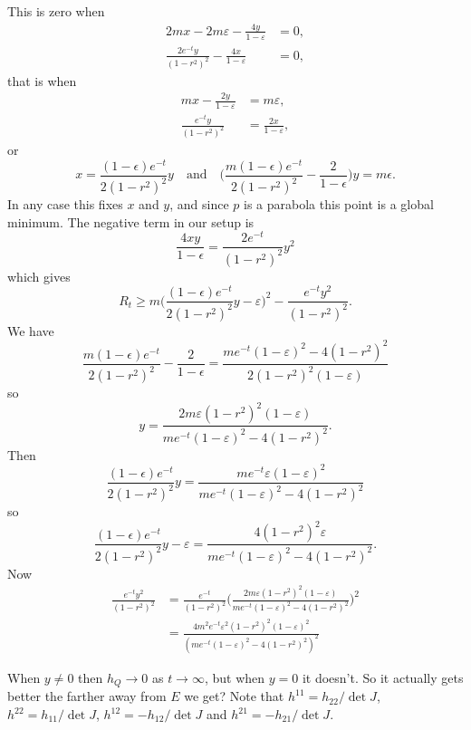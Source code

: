 \documentclass[10pt,a4paper]{amsart}
\def\qandq{\quad\text{and}\quad}
\def\eps{\varepsilon}
\begin{document}
This is zero when
\begin{align*}
2mx - 2 m\varepsilon - \frac{4y}{1-\varepsilon} &= 0,
\\
\frac{2e^{-t}y}{(1-r^2)^2} - \frac{4x}{1-\varepsilon} &= 0,
\end{align*}
that is when
\begin{align*}
mx - \frac{2y}{1-\varepsilon} &= m\varepsilon,
\\
\frac{e^{-t}y}{(1-r^2)^2} &= \frac{2x}{1-\varepsilon},
\end{align*}
or
$$
x = \frac{(1-\epsilon)e^{-t}}{2(1-r^2)^2} y
\qandq
\biggl(\frac{m(1-\epsilon)e^{-t}}{2(1-r^2)^2}
- \frac{2}{1-\epsilon}\biggr)y = m\epsilon.
$$
In any case this fixes $x$ and $y$, and since $p$ is a parabola this point is a
global minimum.
The negative term in our setup is
$$
\frac{4xy}{1-\epsilon}
= \frac{2 e^{-t}}{(1-r^2)^2}y^2
$$
which gives
$$
R_t \geq
m\biggl(
\frac{(1-\epsilon)e^{-t}}{2(1-r^2)^2} y
- \varepsilon
\biggr)^2
- \frac{e^{-t}y^2}{(1-r^2)^2}.
$$
We have
$$
\frac{m(1-\epsilon)e^{-t}}{2(1-r^2)^2}
- \frac{2}{1-\epsilon}
= \frac{me^{-t}(1-\eps)^2 - 4(1-r^2)^2}{2(1-r^2)^2(1-\eps)}
$$
so
$$
y = \frac{2 m \eps (1-r^2)^2 (1-\eps)}{m e^{-t} (1 - \eps)^2 - 4(1-r^2)^2}.
$$
Then
$$
\frac{(1-\epsilon)e^{-t}}{2(1-r^2)^2} y
=
\frac{m e^{-t} \eps (1-\eps)^2}{m e^{-t} (1 - \eps)^2 - 4(1-r^2)^2}
$$
so
$$
\frac{(1-\epsilon)e^{-t}}{2(1-r^2)^2} y - \eps
=
\frac{4(1-r^2)^2 \eps}{m e^{-t} (1 - \eps)^2 - 4(1-r^2)^2}.
$$
Now
\begin{align*}
\frac{e^{-t}y^2}{(1-r^2)^2}
&= \frac{e^{-t}}{(1-r^2)^2}
\biggl(
\frac{2 m \eps (1-r^2)^2 (1-\eps)}{m e^{-t} (1 - \eps)^2 - 4(1-r^2)^2}
\biggr)^2
\\
&=
\frac{4 m^2 e^{-t} \eps^2 (1-r^2)^2 (1-\eps)^2}
{(m e^{-t} (1 - \eps)^2 - 4(1-r^2)^2)^2}
\end{align*}



When $y \not= 0$ then $h_Q \to 0$ as $t \to \infty$, but when $y = 0$ it doesn't.
So it actually gets better the farther away from $E$ we get?
Note that $h^{11} = h_{22} / \det J$, $h^{22} = h_{11} / \det J$,
$h^{12} = -h_{12} / \det J$ and $h^{21} = -h_{21} / \det J$.
\end{document}
